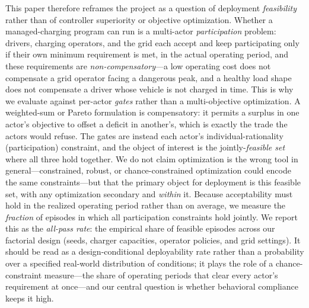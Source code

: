 \documentclass[12pt]{article}
\begin{document}
This paper therefore reframes the project as a question of deployment \emph{feasibility} rather than of controller superiority or objective optimization. Whether a managed-charging program can run is a multi-actor \emph{participation} problem: drivers, charging operators, and the grid each accept and keep participating only if their own minimum requirement is met, in the actual operating period, and these requirements are \emph{non-compensatory}---a low operating cost does not compensate a grid operator facing a dangerous peak, and a healthy load shape does not compensate a driver whose vehicle is not charged in time. This is why we evaluate against per-actor \emph{gates} rather than a multi-objective optimization. A weighted-sum or Pareto formulation is compensatory: it permits a surplus in one actor's objective to offset a deficit in another's, which is exactly the trade the actors would refuse. The gates are instead each actor's individual-rationality (participation) constraint, and the object of interest is the jointly-\emph{feasible set} where all three hold together. We do not claim optimization is the wrong tool in general---constrained, robust, or chance-constrained optimization could encode the same constraints---but that the primary object for deployment is this feasible set, with any optimization secondary and \emph{within} it. Because acceptability must hold in the realized operating period rather than on average, we measure the \emph{fraction} of episodes in which all participation constraints hold jointly. We report this as the \emph{all-pass rate}: the empirical share of feasible episodes across our factorial design (seeds, charger capacities, operator policies, and grid settings). It should be read as a design-conditional deployability rate rather than a probability over a specified real-world distribution of conditions; it plays the role of a chance-constraint measure---the share of operating periods that clear every actor's requirement at once---and our central question is whether behavioral compliance keeps it high.
\end{document}
